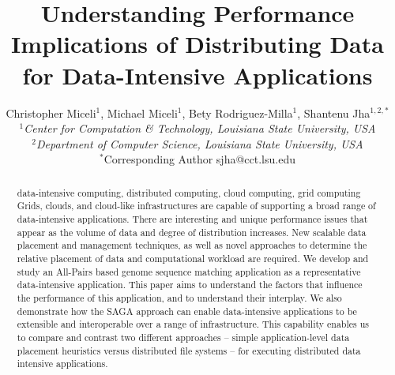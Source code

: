 \documentclass{rspublic}
\title[Understanding Performance Implications of Distributing Data for
Data-Intensive Applications]{Understanding Performance Implications of
Distributing Data for Data-Intensive Applications}
\author[Miceli, Miceli, Rodriguez-Milla, Jha]{ Christopher Miceli$^{1}$,
Michael Miceli$^{1}$, Bety Rodriguez-Milla$^{1}$, Shantenu Jha$^{1,2,*}$ \\
\small{\emph{$^{1}$Center for Computation \& Technology, Louisiana State
University, USA}} \\  \small{\emph{$^{2}$Department of Computer Science,
Louisiana State University, USA}} \\ {\footnotesize {\hspace{0.0 in}
$^*$Corresponding Author sjha@cct.lsu.edu}} }
\begin{document}
 \maketitle

\begin{abstract}{data-intensive computing, distributed computing,
cloud computing, grid computing} 
Grids, clouds, and cloud-like infrastructures are capable of supporting
a broad range of data-intensive applications. There are interesting
and unique performance issues that appear as the volume of data and
degree of distribution increases. New scalable data placement and
management techniques, as well as novel approaches to determine the
relative placement of data and computational workload are required. We
develop and study an All-Pairs based genome sequence matching
application as a representative data-intensive application.  This
paper aims to understand the factors that influence the performance of
this application, and to understand their interplay.  %
We also demonstrate how the SAGA approach can
enable data-intensive applications to be extensible and interoperable
over a range of infrastructure. This capability enables us to compare
and contrast two different approaches -- simple application-level data
placement heuristics versus distributed file systems -- for executing
distributed data intensive applications.

\end{abstract}
\end{document}
